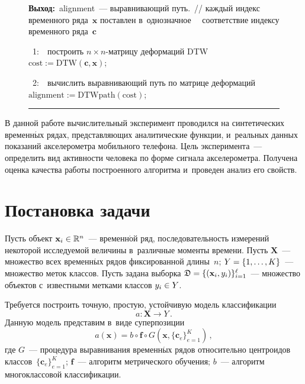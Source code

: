 \begin{multicols}{2}
\begin{figure*}[b]
\noindent
\textbf{Выход:}\ alignment~--- выравнивающий путь.~// {каждый индекс 
временного ряда~$\mathbf{x}$ поставлен в~однозначное\newline
\hphantom{\ 1:}\ \ соответствие индексу временного ряда~$\mathbf{c}$}

\ 1:\ \  {построить $n \times n$-матрицу деформаций DTW}\newline
\hphantom{\ 1:}\ \ $\mathrm{cost} := \mathrm{DTW}(\mathbf{c}, \mathbf{x})$;

\ 2:\ \ {вычислить выравнивающий путь по матрице деформаций}\newline
\hphantom{\ 1:}\ \ $\mathrm{alignment} := \mathrm{DTWpath}(\mathrm{cost})$;

\vspace*{6pt}

\hrule
\end{figure*}

В данной работе вычислительный эксперимент проводился на синтетических временн$\acute{\mbox{ы}}$х 
рядах, представляющих аналитические функции, и~реальных данных показаний акселерометра 
мобильного телефона.
Цель эксперимента~--- определить вид активности человека по форме сигнала акселерометра.
Получена оценка качества работы построенного алгоритма и~проведен анализ его свойств.

\section{Постановка задачи}

Пусть объект $\mathbf{x}_i \hm\in \mathbb{R}^n$~--- временн$\acute{\mbox{о}}$й ряд, последовательность 
измерений некоторой исследуемой величины в~различные моменты времени.
Пусть $\mathbf{X}$~--- множество всех временн$\acute{\mbox{ы}}$х рядов фиксированной длины~$n$; 
$Y \hm= \{1, \dots, K\}$~--- множество меток классов.
Пусть задана выборка $\mathfrak{D} \hm= \{(\mathbf{x}_i, y_i)\}_{i=1}^\ell$~--- 
множество объектов с~известными метками классов $y_i \hm\in Y$.

Требуется построить точную, простую, устойчивую модель классификации
$$
    a: \mathbf{X} \to Y\,.
$$
Данную модель представим в~виде суперпозиции
\begin{equation*}
a(\mathbf{x}) = b \circ \mathbf{f} \circ G(\mathbf{x}, \{\mathbf{c}_e\}_{e = 1} ^ K)\,,
\end{equation*}
 где $G$~--- процедура выравнивания временн$\acute{\mbox{ы}}$х рядов относительно 
 центроидов классов~$\{\mathbf{c}_e\}_{e = 1} ^ K$; $\mathbf{f}$~--- 
 алгоритм метрического обучения; $b$~--- алгоритм многоклассовой классификации.


\end{multicols}
